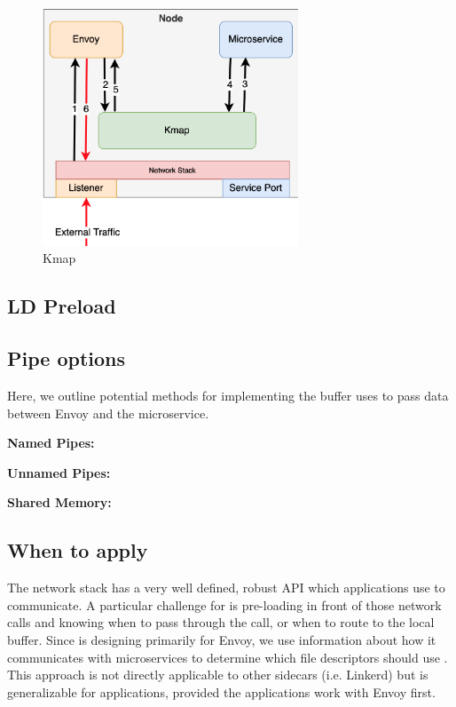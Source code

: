 \begin{figure}[!htb]
    \begin{minipage}{0.5\textwidth}
        \centering
        \includegraphics[keepaspectratio=true,width=3in]{figures/design/kmap.png}
        \caption{Kmap}
        \label{fig:kmap}
    \end{minipage}%
\end{figure}

\subsection{LD Preload}



\subsection{Pipe options}
Here, we outline potential methods for implementing the buffer \sysname uses to pass data between Envoy and the microservice.

\textbf{Named Pipes:}


\textbf{Unnamed Pipes:}


\textbf{Shared Memory:}


\subsection{When to apply \sysname}
The network stack has a very well defined, robust API which applications use to communicate.
A particular challenge for \sysname is pre-loading in front of those network calls and knowing when
to pass through the call, or when to route to the local buffer.
Since \sysname is designing primarily for Envoy, we use information about how it communicates with microservices to determine
which file descriptors should use \sysname.
This approach is not directly applicable to other sidecars (i.e. Linkerd) but is generalizable for applications, provided the applications work with Envoy first.


